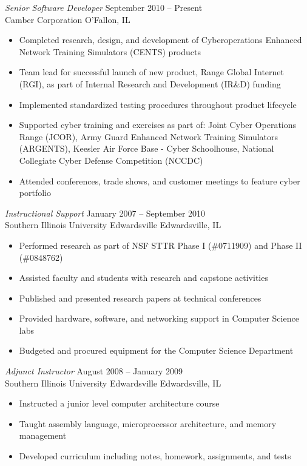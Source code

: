 \documentclass[margin,line]{resume}
\begin{document}
\begin{resume}
{\sl Senior Software Developer} \hfill September 2010 -- Present\\
Camber Corporation \hfill O'Fallon, IL
\begin{itemize} \itemsep -2pt %
    \small\item Completed research, design, and development of  Cyberoperations Enhanced Network Training Simulators (CENTS) products
    \small\item Team lead for successful launch of new product, Range Global Internet (RGI), as part of Internal Research and Development (IR\&D) funding
    \small\item Implemented standardized testing procedures throughout product lifecycle
    \small\item Supported cyber training and exercises as part of: Joint Cyber Operations Range (JCOR), Army Guard Enhanced Network Training Simulators (ARGENTS), Keesler Air Force Base - Cyber Schoolhouse, National Collegiate Cyber Defense Competition (NCCDC)
    \small\item Attended conferences, trade shows, and customer meetings to feature cyber portfolio
\end{itemize}

{\sl Instructional Support} \hfill January 2007 -- September 2010\\
Southern Illinois University Edwardsville \hfill Edwardsville, IL
\begin{itemize} \itemsep -2pt %
    \small\item Performed research as part of NSF STTR Phase I (\#0711909) and Phase II (\#0848762)
    \small\item Assisted faculty and students with research and capstone activities
    \small\item Published and presented research papers at technical conferences
    \small\item Provided hardware, software, and networking support in Computer Science labs
    \small\item Budgeted and procured equipment for the Computer Science Department
\end{itemize}

{\sl Adjunct Instructor} \hfill August 2008 -- January 2009\\
Southern Illinois University Edwardsville \hfill Edwardsville, IL
\begin{itemize} \itemsep -2pt %
    \small\item Instructed a junior level computer architecture course 
    \small\item Taught assembly language, microprocessor architecture, and memory management
    \small\item Developed curriculum including notes, homework, assignments, and tests
\end{itemize}


\end{resume}
\end{document}
